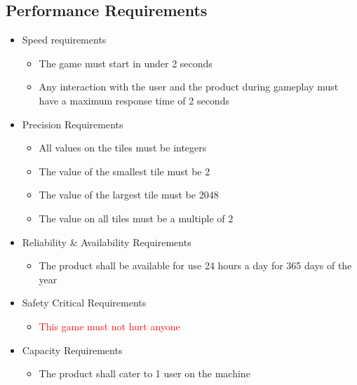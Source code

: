 \documentclass[12pt]{article}
\begin{document}
\subsection{Performance Requirements}
\begin{itemize}
    \item Speed requirements
    \begin{itemize}
        \item The game must start in under 2 seconds
        \item Any interaction with the user and the product during gameplay must have a maximum response time of 2 seconds
    \end{itemize}
    \item{Precision Requirements}
    \begin{itemize}
        \item All values on the tiles must be integers
        \item The value of the smallest tile must be 2
        \item The value of the largest tile must be 2048
        \item The value on all tiles must be a multiple of 2
    \end{itemize}
    \item{Reliability \& Availability Requirements}
    \begin{itemize}
        \item The product shall be available for use 24 hours a day for 365 days of the year
    \end{itemize}
    \item{Safety Critical Requirements}
    \begin{itemize}
        \item \textcolor{red}{This game must not hurt anyone}
    \end{itemize}
    \item{Capacity Requirements}
    \begin{itemize}
        \item The product shall cater to 1 user on the machine
    \end{itemize}
\end{itemize}
\end{document}
